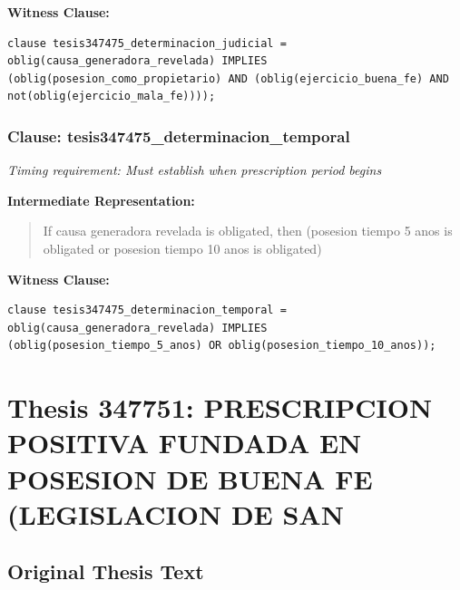 \documentclass[11pt,a4paper]{article}
\begin{document}
\textbf{Witness Clause:}

\begin{lstlisting}[style=witnessstyle, language=Witness]
clause tesis347475_determinacion_judicial = oblig(causa_generadora_revelada) IMPLIES (oblig(posesion_como_propietario) AND (oblig(ejercicio_buena_fe) AND not(oblig(ejercicio_mala_fe))));
\end{lstlisting}

\subsubsection{Clause: tesis347475\_determinacion\_temporal}

\textit{Timing requirement: Must establish when prescription period begins}

\textbf{Intermediate Representation:}

\begin{quote}
If causa generadora revelada is obligated, then (posesion tiempo 5 anos is obligated or posesion tiempo 10 anos is obligated)
\end{quote}

\textbf{Witness Clause:}

\begin{lstlisting}[style=witnessstyle, language=Witness]
clause tesis347475_determinacion_temporal = oblig(causa_generadora_revelada) IMPLIES (oblig(posesion_tiempo_5_anos) OR oblig(posesion_tiempo_10_anos));
\end{lstlisting}

\newpage

\section{Thesis 347751: PRESCRIPCION POSITIVA FUNDADA EN POSESION DE BUENA FE (LEGISLACION DE SAN}
\label{thesis:347751}

\subsection{Original Thesis Text}
\end{document}
